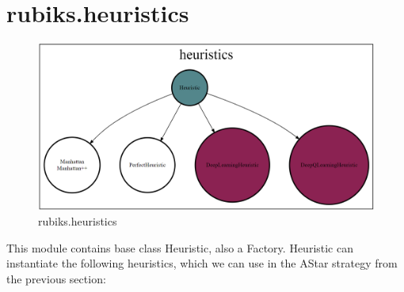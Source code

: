 \section{rubiks.heuristics}
\begin{figure}[H]
\centering
\includegraphics[scale=0.25]{./Figures/codebaseheuristics}
\caption[Codebase]{rubiks.heuristics}
\label{fig:Codebaseheuristics}
\end{figure}
\label{HSS}
This module contains base class Heuristic, also a Factory. Heuristic can instantiate the following heuristics, which we can use in the AStar strategy from the previous section:
